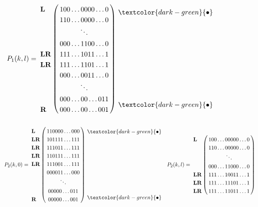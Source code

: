 \documentclass[12pt]{book}
\theoremstyle{plain}
\theoremstyle{remark}
\begin{document}
\begin{figure}[H]
{\begin{align*}
\begin{matrix}
	  \end{matrix}
		&&
			P_1(k,l) =  \bordermatrix{ & \cr
		\textbf{L}& 1 0 0 \ldots 0 0 0 0 \ldots 0 \cr
					  & 1 1 0 \ldots 0 0 0 0  \ldots 0 \cr
					  &  \ddots \cr
					 & 0 0 0 \ldots 1 1 0 0 \ldots 0 \cr
	\textbf{LR} & 1 1 1 \ldots 1 0 1 1 \ldots 1 \cr
	\textbf{LR} & 1 1 1 \ldots 1 1 0 1 \ldots 1 \cr
					 & 0 0 0 \ldots 0 0 1 1  \ldots 0 \cr
					 & \ddots \cr
					& 0 0 0 \ldots 0 0 \ldots 0 1 1 \cr
		\textbf{R} & 0 0 0 \ldots 0 0 \ldots 0 0 1 }\
	\begin{matrix}
	  \textcolor{dark-green}{\bullet} \\ \\ \\ \\ \\ \\ \\ \\ \\ \\ \\ \textcolor{dark-green}{\bullet}
	  \end{matrix}
	\end{align*}
	\begin{align*}
		P_2(k,0) =  \bordermatrix{ & \cr
		\textbf{L} & 1 1 0 0 0 0 \ldots 0 0 0 \cr
		\textbf{LR} & 1 0 1 1 1 1 \ldots 1 1 1 \cr
		\textbf{LR} & 1 1 1 0 1 1 \ldots 1 1 1 \cr
		\textbf{LR} & 1 1 0 1 1 1 \ldots 1 1 1 \cr
		\textbf{LR} & 1 1 1 0 0 1 \ldots 1 1 1 \cr
					     & 0 0  0 0 1  1 \ldots 0 0 0 \cr
						 &  \ddots  \cr
						& 0 0 0 0 0 \ldots  0 1 1  \cr
		\textbf{R} & 0 0 0 0 0 \ldots 0 0 1  }\
	 \begin{matrix}
	  \textcolor{dark-green}{\bullet} \\ \\ \\ \\ \\ \\ \\ \\ \\ \\ \textcolor{dark-green}{\bullet}
	  \end{matrix}
	&&
			P_2(k,l) = \bordermatrix{ & \cr
		\textbf{L}& 1 0 0 \ldots 0 0 0 0 0 \ldots 0 \cr
					  & 1 1 0 \ldots 0 0 0 0 0  \ldots 0 \cr
					  &  \ddots \cr
					 & 0 0 0 \ldots 1 1 0 0 0  \ldots 0 \cr
	\textbf{LR} & 1 1 1 \ldots 1 0 0 1 1 \ldots 1 \cr
	\textbf{LR} & 1 1 1 \ldots 1 1 1 0 1 \ldots 1 \cr
	\textbf{LR} & 1 1 1 \ldots 1 1 0 1 1 \ldots 1 \cr
}
\end{align*}}
\end{figure}
\end{document}

